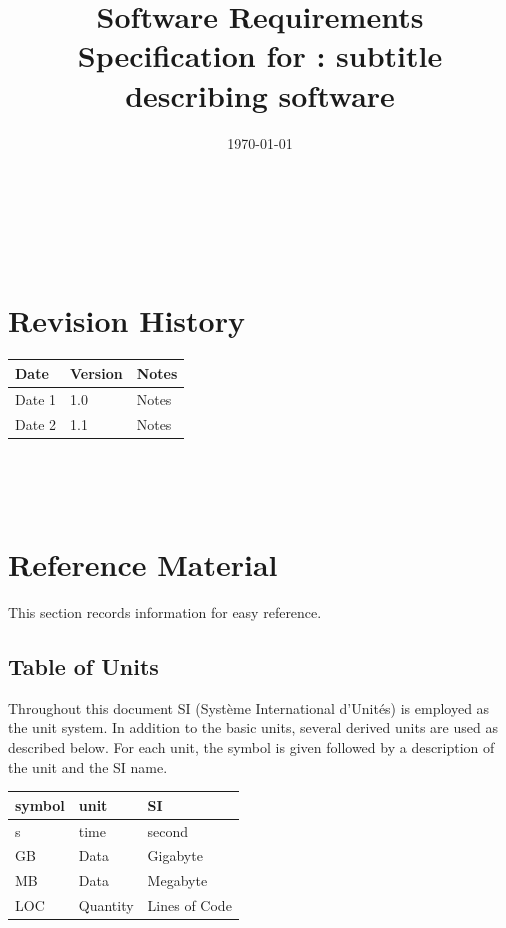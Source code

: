 \documentclass[12pt]{article}
\begin{document}
\title{Software Requirements Specification for \progname: subtitle describing software} 
\author{\authname}
\date{\today}
	
\maketitle

~\newpage
{}
\tableofcontents

~\newpage

\section*{Revision History}

\begin{tabularx}{\textwidth}{p{3cm}p{2cm}X}
\toprule {\bf Date} & {\bf Version} & {\bf Notes}\\
\midrule
Date 1 & 1.0 & Notes\\
Date 2 & 1.1 & Notes\\
\bottomrule
\end{tabularx}

~\\

~\newpage

\section{Reference Material}

This section records information for easy reference.

\subsection{Table of Units}

Throughout this document SI (Syst\`{e}me International d'Unit\'{e}s) is employed
as the unit system.  In addition to the basic units, several derived units are
used as described below.  For each unit, the symbol is given followed by a
description of the unit and the SI name.
~\newline

\renewcommand{\arraystretch}{1.2}
  \noindent \begin{tabular}{l l l} 
    \toprule		
    \textbf{symbol} & \textbf{unit} & \textbf{SI}\\
    \midrule 
    \si{\second} & time  & second\\
    \si{GB} & Data 	& Gigabyte\\
    \si{MB} & Data  & Megabyte\\
    \si{LOC} & Quantity & Lines of Code\\
    \bottomrule
  \end{tabular}
\end{document}

